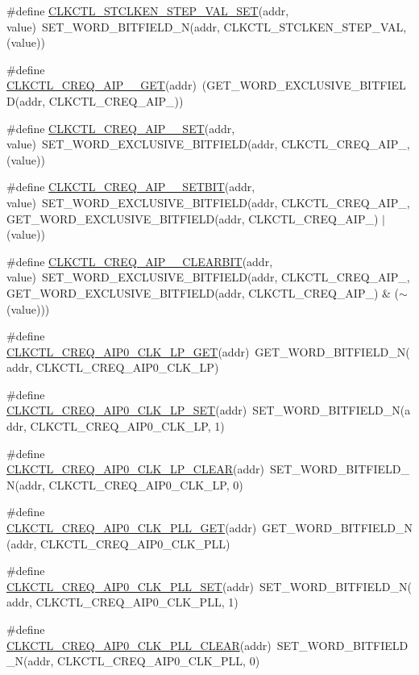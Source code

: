 \begin{DoxyCompactItemize}
\item 
\#define \hyperlink{a00544_ab01b2e2e6ee2501768f659851e13fe2c}{CLKCTL\_\-STCLKEN\_\-STEP\_\-VAL\_\-SET}(addr, value)~SET\_\-WORD\_\-BITFIELD\_\-N(addr, CLKCTL\_\-STCLKEN\_\-STEP\_\-VAL, (value))
\item 
\#define \hyperlink{a00544_a5b86bd6855369fb907e40a2ddc1c6dbc}{CLKCTL\_\-CREQ\_\-AIP\_\_\-GET}(addr)~(GET\_\-WORD\_\-EXCLUSIVE\_\-BITFIELD(addr, CLKCTL\_\-CREQ\_\-AIP\_))
\item 
\#define \hyperlink{a00544_a0491d74917fd31fa918a04f547c34647}{CLKCTL\_\-CREQ\_\-AIP\_\_\-SET}(addr, value)~SET\_\-WORD\_\-EXCLUSIVE\_\-BITFIELD(addr, CLKCTL\_\-CREQ\_\-AIP\_, (value))
\item 
\#define \hyperlink{a00544_af6c63fa4a3ca4908d97bc8774b39dafd}{CLKCTL\_\-CREQ\_\-AIP\_\_\-SETBIT}(addr, value)~SET\_\-WORD\_\-EXCLUSIVE\_\-BITFIELD(addr, CLKCTL\_\-CREQ\_\-AIP\_, GET\_\-WORD\_\-EXCLUSIVE\_\-BITFIELD(addr, CLKCTL\_\-CREQ\_\-AIP\_) $|$ (value))
\item 
\#define \hyperlink{a00544_a0217e2cbd202048f1c1ea611398bbac3}{CLKCTL\_\-CREQ\_\-AIP\_\_\-CLEARBIT}(addr, value)~SET\_\-WORD\_\-EXCLUSIVE\_\-BITFIELD(addr, CLKCTL\_\-CREQ\_\-AIP\_, GET\_\-WORD\_\-EXCLUSIVE\_\-BITFIELD(addr, CLKCTL\_\-CREQ\_\-AIP\_) \& ($\sim$(value)))
\item 
\#define \hyperlink{a00544_a7ff15db2d50b33e957eeae3a2530ab9a}{CLKCTL\_\-CREQ\_\-AIP0\_\-CLK\_\-LP\_\-GET}(addr)~GET\_\-WORD\_\-BITFIELD\_\-N(addr, CLKCTL\_\-CREQ\_\-AIP0\_\-CLK\_\-LP)
\item 
\#define \hyperlink{a00544_a732e566667b205a56bb39c2aa816b8fe}{CLKCTL\_\-CREQ\_\-AIP0\_\-CLK\_\-LP\_\-SET}(addr)~SET\_\-WORD\_\-BITFIELD\_\-N(addr, CLKCTL\_\-CREQ\_\-AIP0\_\-CLK\_\-LP, 1)
\item 
\#define \hyperlink{a00544_a10ea02345bbd0de0850a3438ff5dfcf5}{CLKCTL\_\-CREQ\_\-AIP0\_\-CLK\_\-LP\_\-CLEAR}(addr)~SET\_\-WORD\_\-BITFIELD\_\-N(addr, CLKCTL\_\-CREQ\_\-AIP0\_\-CLK\_\-LP, 0)
\item 
\#define \hyperlink{a00544_a048b8b582bf0532022114f89b74cc86f}{CLKCTL\_\-CREQ\_\-AIP0\_\-CLK\_\-PLL\_\-GET}(addr)~GET\_\-WORD\_\-BITFIELD\_\-N(addr, CLKCTL\_\-CREQ\_\-AIP0\_\-CLK\_\-PLL)
\item 
\#define \hyperlink{a00544_a7bf809e56f7231e18ca9df52e8c35066}{CLKCTL\_\-CREQ\_\-AIP0\_\-CLK\_\-PLL\_\-SET}(addr)~SET\_\-WORD\_\-BITFIELD\_\-N(addr, CLKCTL\_\-CREQ\_\-AIP0\_\-CLK\_\-PLL, 1)
\item 
\#define \hyperlink{a00544_a85377350bbb48dc5753318d47fd86537}{CLKCTL\_\-CREQ\_\-AIP0\_\-CLK\_\-PLL\_\-CLEAR}(addr)~SET\_\-WORD\_\-BITFIELD\_\-N(addr, CLKCTL\_\-CREQ\_\-AIP0\_\-CLK\_\-PLL, 0)

\end{DoxyCompactItemize}

